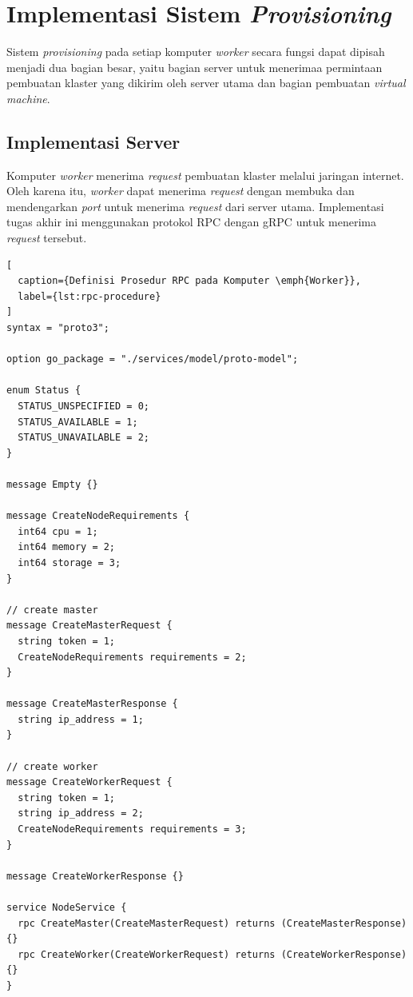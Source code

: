 \section{Implementasi Sistem \emph{Provisioning}}
\label{sec:implementasi-sistem-provisioning}

Sistem \emph{provisioning} pada setiap komputer \emph{worker} secara fungsi dapat dipisah
menjadi dua bagian besar, yaitu bagian server untuk menerimaa permintaan pembuatan klaster yang dikirim
oleh server utama dan bagian pembuatan \emph{virtual machine}.

\subsection{Implementasi Server}
\label{sec:server}

Komputer \emph{worker} menerima \emph{request} pembuatan klaster melalui jaringan internet.
Oleh karena itu, \emph{worker} dapat menerima \emph{request} dengan membuka dan mendengarkan \emph{port}
untuk menerima \emph{request} dari server utama. Implementasi tugas akhir ini menggunakan protokol
RPC dengan gRPC untuk menerima \emph{request} tersebut.

\begin{lstlisting}[
  caption={Definisi Prosedur RPC pada Komputer \emph{Worker}},
  label={lst:rpc-procedure}
]
syntax = "proto3";

option go_package = "./services/model/proto-model";

enum Status {
  STATUS_UNSPECIFIED = 0;
  STATUS_AVAILABLE = 1;
  STATUS_UNAVAILABLE = 2;
}

message Empty {}

message CreateNodeRequirements {
  int64 cpu = 1;
  int64 memory = 2;
  int64 storage = 3;
}

// create master
message CreateMasterRequest {
  string token = 1;
  CreateNodeRequirements requirements = 2;
}

message CreateMasterResponse {
  string ip_address = 1;
}

// create worker
message CreateWorkerRequest {
  string token = 1;
  string ip_address = 2;
  CreateNodeRequirements requirements = 3;
}

message CreateWorkerResponse {}

service NodeService {
  rpc CreateMaster(CreateMasterRequest) returns (CreateMasterResponse) {}
  rpc CreateWorker(CreateWorkerRequest) returns (CreateWorkerResponse) {}
}
\end{lstlisting}

